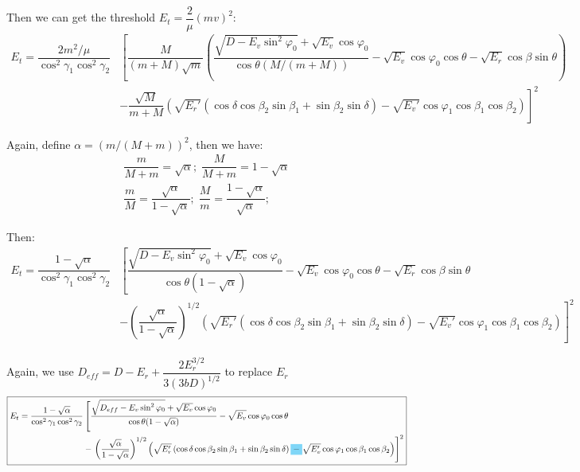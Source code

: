 \documentclass[11pt,letterpaper]{article}
\renewcommand{\phi}{\varphi}
\newcommand{\highlight}[1]{%
	\colorbox{cyan!50}{$\displaystyle#1$}}
\begin{document}
Then we can get the threshold $ E_t = \dfrac{2}{\mu} (mv)^2 $:
\begin{equation}
\begin{aligned}
E_t = \dfrac{2m^2/\mu}{\cos^2 \gamma_1 \cos^2 \gamma_2}& \left[\dfrac{M}{(m+M) \sqrt{m}} \left( \dfrac{\sqrt{D- E_v \sin^2 \phi_0} + \sqrt{E_v} \cos \phi_0 }{\cos \theta (M/(m+M))} - \sqrt{E_v} \cos\phi_0 \cos \theta - \sqrt{E_r} \cos\beta \sin \theta \right)  \right.\\
& -\left. \dfrac{\sqrt{M}}{m+M} \left( \sqrt{E_r'}\left( \cos \delta \cos\beta_2 \sin \beta _1  + \sin\beta_2\sin \delta \right)- \sqrt{E_v'}  \cos \phi_1 \cos \beta _1 \cos\beta _2 \right) \right]^2
\end{aligned}
\end{equation}



Again, define $ \alpha = (m/(M+m))^2 $, then we have:
\begin{gather}
\dfrac{m}{M+m} = \sqrt{\alpha}; \; \dfrac{M}{M+m} = 1-\sqrt{\alpha} \\
\dfrac{m}{M} = \dfrac{\sqrt{\alpha}}{1-\sqrt{\alpha}}; \;\dfrac{M}{m} = \dfrac{1-\sqrt{\alpha}}{\sqrt{\alpha}};
\end{gather}

Then:
\begin{equation}
\begin{aligned}
E_t = \dfrac{1 - \sqrt{\alpha}}{\cos^2 \gamma_1 \cos^2 \gamma_2}& \left[ \dfrac{\sqrt{D- E_v \sin^2 \phi_0} + \sqrt{E_v} \cos \phi_0 }{\cos \theta (1 - \sqrt{\alpha})} - \sqrt{E_v} \cos\phi_0 \cos \theta - \sqrt{E_r} \cos\beta \sin \theta \right.\\
& -\left.   \left(\dfrac{\sqrt{\alpha}}{1-\sqrt{\alpha}}\right)^{1/2}\left( \sqrt{E_r'}\left( \cos \delta \cos\beta_2 \sin \beta _1  + \sin\beta_2\sin \delta \right)- \sqrt{E_v'}  \cos \phi_1 \cos \beta _1 \cos\beta _2 \right) \right]^2
\end{aligned}
\end{equation}

Again, we use $ D_{eff} = D-E_r+ \dfrac{2E_r^{3/2}}{3(3bD)^{1/2}}$ to replace $ E_r $
\begin{equation}
\boxed{
\begin{aligned}
E_t = \dfrac{1 - \sqrt{\alpha}}{\cos^2 \gamma_1 \cos^2 \gamma_2}& \left[ \dfrac{\sqrt{D_{eff}- E_v \sin^2 \phi_0} + \sqrt{E_v} \cos \phi_0 }{\cos \theta (1 - \sqrt{\alpha})} - \sqrt{E_v} \cos\phi_0 \cos \theta \right.\\
& -\left.   \left(\dfrac{\sqrt{\alpha}}{1-\sqrt{\alpha}}\right)^{1/2}\left( \sqrt{E_r'}\left( \cos \delta \cos\beta_2 \sin \beta _1  + \sin\beta_2\sin \delta \right) \highlight{-} \sqrt{E_v'}  \cos \phi_1 \cos \beta _1 \cos\beta _2 \right) \right]^2
\end{aligned}}
\label{eq:1}
\end{equation}
\end{document}
